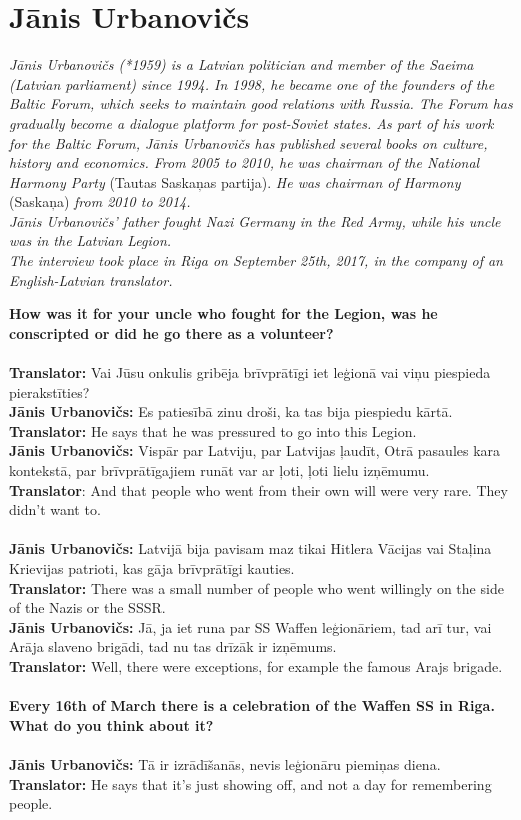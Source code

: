 \section{Jānis Urbanovičs}

\textit{Jānis Urbanovičs (*1959) is a Latvian politician and member of the Saeima (Latvian parliament) since 1994. In 1998, he became one of the founders of the Baltic Forum, which seeks to maintain good relations with Russia. The Forum has gradually become a dialogue platform for post-Soviet states. As part of his work for the Baltic Forum, Jānis Urbanovičs has published several books on culture, history and economics. From 2005 to 2010, he was chairman of the National Harmony Party} (Tautas Saskaņas partija). \textit{He was chairman of Harmony} (Saskaņa) \textit{from 2010 to 2014.\\
Jānis Urbanovičs’ father fought Nazi Germany in the Red Army, while his uncle was in the Latvian Legion.\\
The interview took place in Riga on September 25th, 2017, in the company of an English-Latvian translator.}\par
\vspace*{2em}
\textbf{How was it for your uncle who fought for the Legion, was he conscripted or did he go there as a volunteer?}\\
\\
\textbf{Translator:} Vai Jūsu onkulis gribēja brīvprātīgi iet leģionā vai viņu piespieda pierakstīties?\\
\textbf{Jānis Urbanovičs:} Es patiesībā zinu droši, ka tas bija piespiedu kārtā.\\
\textbf{Translator:} He says that he was pressured to go into this Legion.\\
\textbf{Jānis Urbanovičs:} Vispār par Latviju, par Latvijas ļaudīt, Otrā pasaules kara kontekstā, par brīvprātīgajiem runāt var ar ļoti, ļoti lielu izņēmumu.\\
\textbf{Translator}: And that people who went from their own will were very rare. They didn’t want to.\\
\\
\textbf{Jānis Urbanovičs:} Latvijā bija pavisam maz tikai Hitlera Vācijas vai Staļina Krievijas patrioti, kas gāja brīvprātīgi kauties. \\
\textbf{Translator:} There was a small number of people who went willingly on the side of the Nazis or the SSSR.\\ 
\textbf{Jānis Urbanovičs:} Jā, ja iet runa par SS Waffen leģionāriem, tad arī tur, vai Arāja slaveno brigādi, tad nu tas drīzāk ir izņēmums.\\
\textbf{Translator:} Well, there were exceptions, for example the famous Arajs brigade.\\
\\
\textbf{Every 16th of March there is a celebration of the Waffen SS in Riga. What do you think about it?} \\
\\
\textbf{Jānis Urbanovičs:} Tā ir izrādīšanās, nevis leģionāru piemiņas diena.\\
\textbf{Translator:} He says that it’s just showing off, and not a day for remembering people.

